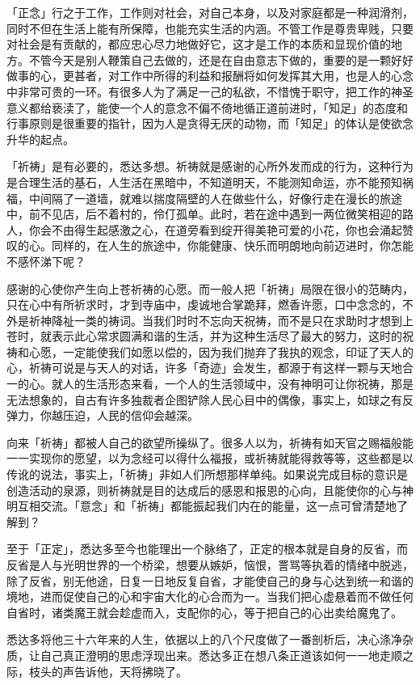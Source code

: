 \documentclass[twoside,openany]{book}
\begin{document}
「正念」行之于工作，工作则对社会，对自己本身，以及对家庭都是一种润滑剂，同时不但在生活上能有所保障，也能充实生活的内涵。不管工作是尊贵卑贱，只要对社会是有贡献的，都应忠心尽力地做好它，这才是工作的本质和显现价值的地方。不管今天是别人鞭策自己去做的，还是在自由意志下做的，重要的是一颗好好做事的心，更甚者，对工作中所得的利益和报酬将如何发挥其大用，也是人的心念中非常可贵的一环。有很多人为了满足一己的私欲，不惜愧于职守，把工作的神圣意义都给亵渎了，能使一个人的意念不偏不倚地循正道前进时，「知足」的态度和行事原则是很重要的指针，因为人是贪得无厌的动物，而「知足」的体认是使欲念升华的起点。

「祈祷」是有必要的，悉达多想。祈祷就是感谢的心所外发而成的行为，这种行为是合理生活的基石，人生活在黑暗中，不知道明天，不能测知命运，亦不能预知祸福，中间隔了一道墙，就难以揣度隔壁的人在做些什么，好像行走在漫长的旅途中，前不见店，后不着村的，伶仃孤单。此时，若在途中遇到一两位微笑相迎的路人，你会不由得生起感激之心，在道旁看到绽开得美艳可爱的小花，你也会涌起赞叹的心。同样的，在人生的旅途中，你能健康、快乐而明朗地向前迈进时，你怎能不感怀涕下呢？

感谢的心使你产生向上苍祈祷的心愿。而一般人把「祈祷」局限在很小的范畴内，只在心中有所祈求时，才到寺庙中，虔诚地合掌跪拜，燃香许愿，口中念念的，不外是祈神降祉一类的祷词。当我们时时不忘向天祝祷，而不是只在求助时才想到上苍时，就表示此心常求圆满和谐的生活，并为这种生活尽了最大的努力，这时的祝祷和心愿，一定能使我们如愿以偿的，因为我们抛弃了我执的观念，印证了天人的心，祈祷可说是与天人的对话，许多「奇迹」会发生，都源于有这样一颗与天地合一的心。就人的生活形态来看，一个人的生活领域中，没有神明可让你祝祷，那是无法想象的，自古有许多独裁者企图铲除人民心目中的偶像，事实上，如球之有反弹力，你越压迫，人民的信仰会越深。

向来「祈祷」都被人自己的欲望所操纵了。很多人以为，祈祷有如天官之赐福般能一一实现你的愿望，以为念经可以得什么福报，或祈祷就能得救等等，这些都是以传讹的说法，事实上，「祈祷」非如人们所想那样单纯。如果说完成目标的意识是创造活动的泉源，则祈祷就是目的达成后的感恩和报恩的心向，且能使你的心与神明互相交流。「意念」和「祈祷」都能振起我们内在的能量，这一点可曾清楚地了解到？

至于「正定」，悉达多至今也能理出一个脉络了，正定的根本就是自身的反省，而反省是人与光明世界的一个桥梁，想要从嫉妒，恼恨，詈骂等执着的情绪中脱逃，除了反省，别无他途，日复一日地反复自省，才能使自己的身与心达到统一和谐的境地，进而促使自己的心和宇宙大化的心合而为一。当我们把心虚悬着而不做任何自省时，诸类魔王就会趁虚而入，支配你的心，等于把自己的心出卖给魔鬼了。

悉达多将他三十六年来的人生，依据以上的八个尺度做了一番剖析后，决心涤净杂质，让自己真正澄明的思虑浮现出来。悉达多正在想八条正道该如何一一地走顺之际，枝头的声告诉他，天将拂晓了。
\end{document}

